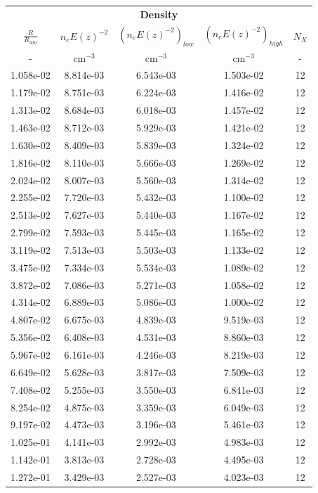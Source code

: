 \documentclass[traditabstract   ]{aa} %
\begin{document}
\begin{appendix}
\begin{table}
\begin{center}
\begin{tabular}{ c c c c c }
\multicolumn{5}{c}{\bf Density} \\
$\frac{R}{R_{500}}$ & $n_e E(z)^{-2}$ & $(n_e E(z)^{-2})_{low}$  & $(n_e E(z)^{-2})_{high}$ & $N_X$  \\
- & cm$^{-3}$ & cm$^{-3}$  & cm$^{-3}$ & -  \\
\hline
1.058e-02 & 8.814e-03 & 6.543e-03 & 1.503e-02 & 12 \\
1.179e-02 & 8.751e-03 & 6.224e-03 & 1.416e-02 & 12 \\
1.313e-02 & 8.684e-03 & 6.018e-03 & 1.457e-02 & 12 \\
1.463e-02 & 8.712e-03 & 5.929e-03 & 1.421e-02 & 12 \\
1.630e-02 & 8.409e-03 & 5.839e-03 & 1.324e-02 & 12 \\
1.816e-02 & 8.110e-03 & 5.666e-03 & 1.269e-02 & 12 \\
2.024e-02 & 8.007e-03 & 5.560e-03 & 1.314e-02 & 12 \\
2.255e-02 & 7.720e-03 & 5.432e-03 & 1.100e-02 & 12 \\
2.513e-02 & 7.627e-03 & 5.440e-03 & 1.167e-02 & 12 \\
2.799e-02 & 7.593e-03 & 5.445e-03 & 1.165e-02 & 12 \\
3.119e-02 & 7.513e-03 & 5.503e-03 & 1.133e-02 & 12 \\
3.475e-02 & 7.334e-03 & 5.534e-03 & 1.089e-02 & 12 \\
3.872e-02 & 7.086e-03 & 5.271e-03 & 1.058e-02 & 12 \\
4.314e-02 & 6.889e-03 & 5.086e-03 & 1.000e-02 & 12 \\
4.807e-02 & 6.675e-03 & 4.839e-03 & 9.519e-03 & 12 \\
5.356e-02 & 6.408e-03 & 4.531e-03 & 8.860e-03 & 12 \\
5.967e-02 & 6.161e-03 & 4.246e-03 & 8.219e-03 & 12 \\
6.649e-02 & 5.628e-03 & 3.817e-03 & 7.509e-03 & 12 \\
7.408e-02 & 5.255e-03 & 3.550e-03 & 6.841e-03 & 12 \\
8.254e-02 & 4.875e-03 & 3.359e-03 & 6.049e-03 & 12 \\
9.197e-02 & 4.473e-03 & 3.196e-03 & 5.461e-03 & 12 \\
1.025e-01 & 4.141e-03 & 2.992e-03 & 4.983e-03 & 12 \\
1.142e-01 & 3.813e-03 & 2.728e-03 & 4.495e-03 & 12 \\
1.272e-01 & 3.429e-03 & 2.527e-03 & 4.023e-03 & 12 \\

\end{tabular}
\end{center}
\end{table}
\end{appendix}
\end{document}
